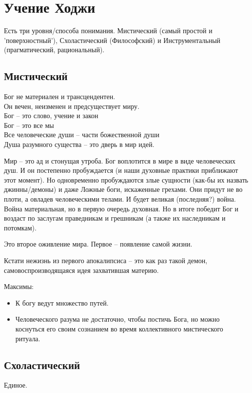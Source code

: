 \documentclass[12pt,a4paper]{article}
\begin{document}
\section*{Учение Ходжи}

Есть три уровня/способа понимания. Мистический (самый простой и 'поверхностный'), Схоластический (Философский) и Инструментальный (прагматический, рациональный).

\subsection*{Мистический}
Бог не материален и трансцендентен.\\
Он вечен, неизменен и предсуществует миру.\\
Бог -- это слово, учение и закон\\
Бог -- это все мы\\
Все человеческие души -- части божественной души\\
Душа разумного существа -- это дверь в мир идей.

Мир -- это ад и стонущая утроба. Бог воплотится в мире в виде человеческих душ.
И он постепенно пробуждается (и наши духовные практики приближают этот момент). 
Но одновременно пробуждаются злые сущности (как-бы их назвать джинны/демоны) и даже Ложные боги, искаженные грехами. Они придут не во плоти, а овладев человеческими телами. И будет великая (последняя?) война. Война материальная, но в первую очередь духовная. Но в итоге победит Бог и воздаст по заслугам праведникам и грешникам (а также их наследникам и потомкам).

Это второе оживление мира. Первое -- появление самой жизни.

Кстати нежизнь из первого апокалипсиса -- это как раз такой демон, самовоспроизводящаяся идея захватившая материю.

Максимы:
\begin{itemize}
	\item К богу ведут множество путей.
	\item Человеческого разума не достаточно, чтобы постичь Бога, но можно коснуться его своим сознанием во время коллективного мистического ритуала.
	
\end{itemize}

\subsection*{Схоластический}
Единое.
\end{document}
